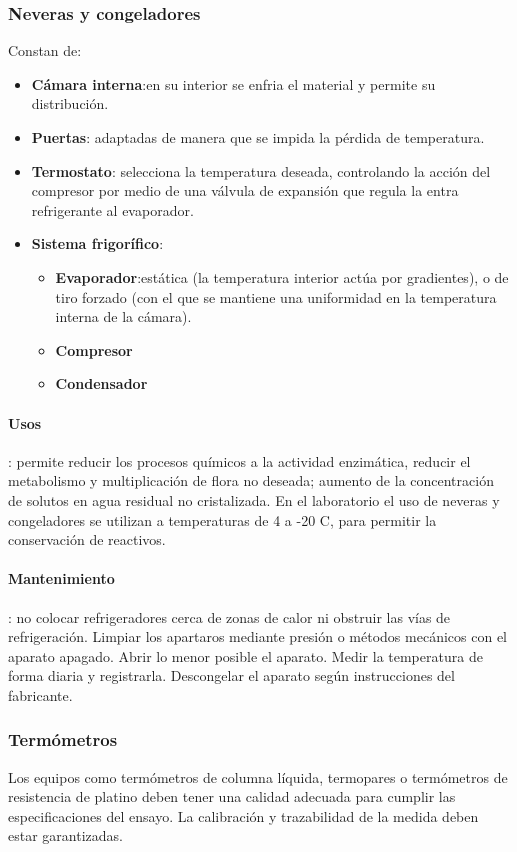\subsubsection{Neveras y congeladores}
Constan de:
\begin{itemize}[itemsep=0pt,parsep=0pt,topsep=0pt,partopsep=0pt]
    \item \textbf{Cámara interna}:en su interior se enfria el material y permite su distribución.
    \item\textbf{Puertas}: adaptadas de manera que se impida la pérdida de temperatura.
    \item\textbf{Termostato}: selecciona la temperatura deseada, controlando la acción del compresor por medio de una válvula de expansión que regula la entra refrigerante al evaporador.
    \item\textbf{Sistema frigorífico}:
    \begin{itemize}[itemsep=0pt,parsep=0pt,topsep=0pt,partopsep=0pt]
        \item \textbf{Evaporador}:estática (la temperatura interior actúa por gradientes), o de tiro forzado (con el que se mantiene una uniformidad en la temperatura interna de la cámara).
        \item\textbf{Compresor}
        \item\textbf{Condensador}
    \end{itemize}
\end{itemize}
\paragraph{Usos}: permite reducir los procesos químicos a la actividad enzimática, reducir el metabolismo y multiplicación de flora no deseada; aumento de la concentración de solutos en agua residual no cristalizada. En el laboratorio el uso de neveras y congeladores se utilizan a temperaturas de 4 a -20 C, para permitir la conservación de reactivos.
\paragraph{Mantenimiento}: no colocar refrigeradores cerca de zonas de calor ni obstruir las vías de refrigeración. Limpiar los apartaros mediante presión o métodos mecánicos con el aparato apagado. Abrir lo menor posible el aparato. Medir la temperatura de forma diaria y registrarla. Descongelar el aparato según instrucciones del fabricante. 
\subsubsection{Termómetros}
Los equipos como termómetros de columna líquida, termopares o termómetros de resistencia de platino deben tener una calidad adecuada para cumplir las especificaciones del ensayo. La calibración y trazabilidad de la medida deben estar garantizadas.

